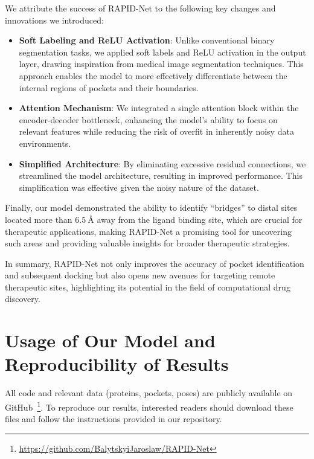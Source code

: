 \documentclass[10pt,conference]{IEEEtran}
\begin{document}
We attribute the success of RAPID-Net to the following key changes and innovations we introduced: 

\begin{itemize} 

\item \textbf{Soft Labeling and ReLU Activation}: Unlike conventional binary segmentation tasks, we applied soft labels and ReLU activation in the output layer, drawing inspiration from medical image segmentation techniques. This approach enables the model to more effectively differentiate between the internal regions of pockets and their boundaries. 

\item \textbf{Attention Mechanism}: We integrated a single attention block within the encoder-decoder bottleneck, enhancing the model's ability to focus on relevant features while reducing the risk of overfit in inherently noisy data environments.

\item \textbf{Simplified Architecture}: By eliminating excessive residual connections, we streamlined the model architecture, resulting in improved performance. This simplification was effective given the noisy nature of the dataset.

\end{itemize}

Finally, our model demonstrated the ability to identify ``bridges'' to distal sites located more than $6.5\ \text{\AA}$ away from the ligand binding site, which are crucial for therapeutic applications, making RAPID-Net a promising tool for uncovering such areas and providing valuable insights for broader therapeutic strategies.

In summary, RAPID-Net not only improves the accuracy of pocket identification and subsequent docking but also opens new avenues for targeting remote therapeutic sites, highlighting its potential in the field of computational drug discovery.


\section*{Usage of Our Model and Reproducibility of Results}

All code and relevant data (proteins, pockets, poses) are publicly available on GitHub~\footnote{\href{https://github.com/BalytskyiJaroslaw/RAPID-Net}{https://github.com/BalytskyiJaroslaw/RAPID-Net}}. To reproduce our results, interested readers should download these files and follow the instructions provided in our repository.
\end{document}

